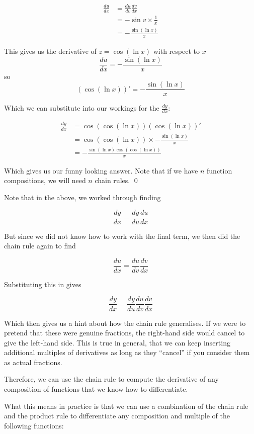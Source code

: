 \begin{solution}
    \begin{align*}
        \frac{du}{dx} &= \frac{du}{dv} \frac{dv}{dx} \\
         &=  -\sin v \times \frac{1}{x}  \tag{substituting our workings} \\
         &= -\frac{\sin (\ln x)}{x} \tag{using $v = \ln x$}
    \end{align*}

    This gives us the derivative of $z = \cos(\ln x)$ with respect to $x$
    \[
    \frac{du}{dx} = -\frac{\sin (\ln x)}{x}
    \]
    so
    \[
    (\cos(\ln x))' = -\frac{\sin (\ln x)}{x}
    \]

    Which we can substitute into our workings for the $\frac{dy}{dx}$:

    \begin{align*}
        \frac{dy}{dx} &= \cos (\cos(\ln x)) (\cos(\ln x))' \tag{from before}\\
         &= \cos (\cos(\ln x))  \times -\frac{\sin (\ln x)}{x} \\ 
          &= - \frac{\sin (\ln x)\cos (\cos(\ln x))}{x}
    \end{align*}

    Which gives us our funny looking answer. Note that if we have $n$ function compositions, we will need $n$ chain rules.
    \qed
\end{solution}

Note that in the above, we worked through finding 

\[ \frac{dy}{dx} = \frac{dy}{du}\frac{du}{dx}\]

But since we did not know how to work with the final term, we then did the chain rule again to find 

\[ \frac{du}{dx} = \frac{du}{dv}\frac{dv}{dx}\]

Substituting this in gives 

\[ \frac{dy}{dx} = \frac{dy}{du}\frac{du}{dv}\frac{dv}{dx}\]

Which then gives us a hint about how the chain rule generalises. If we were to pretend that these were genuine fractions, 
the right-hand side would cancel to give the left-hand side. This is true in general, that we can keep inserting additional multiples of derivatives 
as long as they ``cancel'' if you consider them as actual fractions.

Therefore, we can use the chain rule to compute the derivative of any composition of functions that we know how to differentiate.

What this means in practice is that we can use a combination of the chain rule and the product rule to differentiate any composition and multiple of the following functions:

